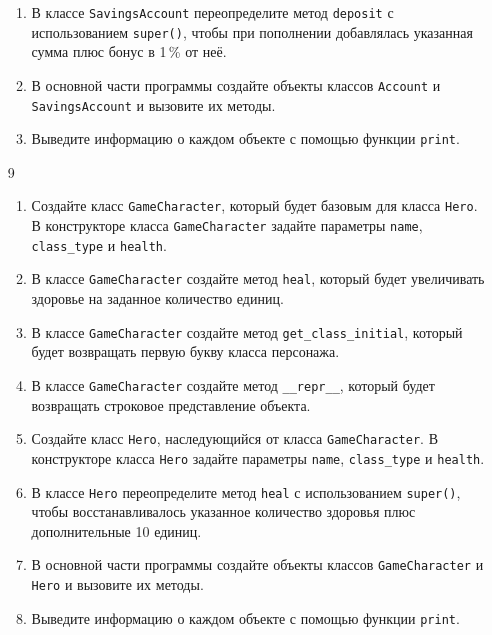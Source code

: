 \begin{enumerate}
\begin{enumerate}[leftmargin=*]
    \item В классе \texttt{SavingsAccount} переопределите метод \texttt{deposit} с использованием \texttt{super()}, чтобы при пополнении добавлялась указанная сумма плюс бонус в 1\,\% от неё.
    
    \item В основной части программы создайте объекты классов \texttt{Account} и \texttt{SavingsAccount} и вызовите их методы.
    
    \item Выведите информацию о каждом объекте с помощью функции \texttt{print}.
\end{enumerate}

\item[9] 
\begin{enumerate}[leftmargin=*]
    \item Создайте класс \texttt{GameCharacter}, который будет базовым для класса \texttt{Hero}. В конструкторе класса \texttt{GameCharacter} задайте параметры \texttt{name}, \texttt{class\_type} и \texttt{health}.
    
    \item В классе \texttt{GameCharacter} создайте метод \texttt{heal}, который будет увеличивать здоровье на заданное количество единиц.
    
    \item В классе \texttt{GameCharacter} создайте метод \texttt{get\_class\_initial}, который будет возвращать первую букву класса персонажа.
    
    \item В классе \texttt{GameCharacter} создайте метод \texttt{\_\_repr\_\_}, который будет возвращать строковое представление объекта.
    
    \item Создайте класс \texttt{Hero}, наследующийся от класса \texttt{GameCharacter}. В конструкторе класса \texttt{Hero} задайте параметры \texttt{name}, \texttt{class\_type} и \texttt{health}.
    
    \item В классе \texttt{Hero} переопределите метод \texttt{heal} с использованием \texttt{super()}, чтобы восстанавливалось указанное количество здоровья плюс дополнительные 10 единиц.
    
    \item В основной части программы создайте объекты классов \texttt{GameCharacter} и \texttt{Hero} и вызовите их методы.
    
    \item Выведите информацию о каждом объекте с помощью функции \texttt{print}.
\end{enumerate}


\end{enumerate}
